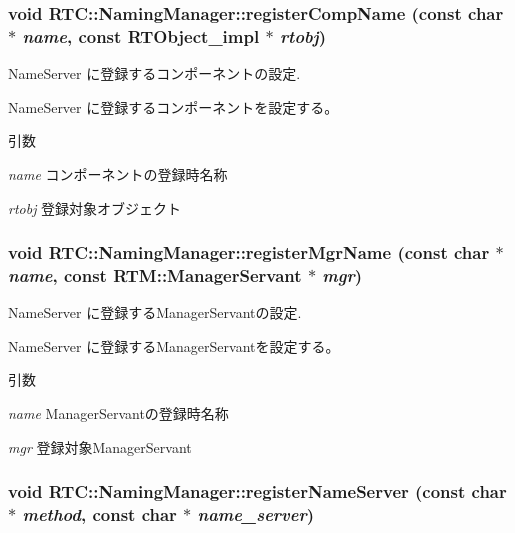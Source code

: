 \subsubsection[{registerCompName}]{\setlength{\rightskip}{0pt plus 5cm}void RTC::NamingManager::registerCompName (const char $\ast$ {\em name}, \/  const {\bf RTObject\_\-impl} $\ast$ {\em rtobj})\hspace{0.3cm}{\ttfamily  [protected]}}\label{classRTC_1_1NamingManager_a35243abca48730805b8172181b7e1256}


NameServer に登録するコンポーネントの設定. 

NameServer に登録するコンポーネントを設定する。


\begin{DoxyParams}{引数}
\item[{\em name}]コンポーネントの登録時名称 \item[{\em rtobj}]登録対象オブジェクト \end{DoxyParams}
\subsubsection[{registerMgrName}]{\setlength{\rightskip}{0pt plus 5cm}void RTC::NamingManager::registerMgrName (const char $\ast$ {\em name}, \/  const {\bf RTM::ManagerServant} $\ast$ {\em mgr})\hspace{0.3cm}{\ttfamily  [protected]}}\label{classRTC_1_1NamingManager_a5980b779fee33d57b28e6d67b897f033}


NameServer に登録するManagerServantの設定. 

NameServer に登録するManagerServantを設定する。


\begin{DoxyParams}{引数}
\item[{\em name}]ManagerServantの登録時名称 \item[{\em mgr}]登録対象ManagerServant \end{DoxyParams}
\subsubsection[{registerNameServer}]{\setlength{\rightskip}{0pt plus 5cm}void RTC::NamingManager::registerNameServer (const char $\ast$ {\em method}, \/  const char $\ast$ {\em name\_\-server})}\label{classRTC_1_1NamingManager_ab2155792df34d57d0ef6a802914bb9e4}


